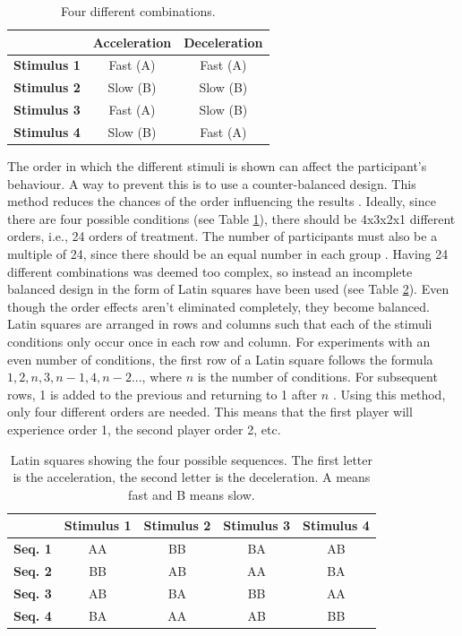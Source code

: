 \begin{table}[htbp]
\small
\centering
\begin{tabular}{|c|c|c|}
\hline  & \textbf{Acceleration}
& \textbf{Deceleration}\\\hline
\textbf{Stimulus 1} & Fast (A)
& Fast (A)
\\\hline
\textbf{Stimulus 2} & Slow (B)
& Slow (B)
\\\hline
\textbf{Stimulus 3} & Fast (A)
& Slow (B)
\\\hline
\textbf{Stimulus 4} & Slow (B)
& Fast (A)
\\\hline
\end{tabular}
\caption{Four different combinations.}
\label{tab:combinations}
\end{table}

The order in which the different stimuli is shown can affect the participant's behaviour.  A way to prevent this is to use a counter-balanced design. This method reduces the chances of the order influencing the results \cite{experimental2}. Ideally, since there are four possible conditions (see Table \ref{tab:combinations}), there should be 4x3x2x1 different orders, i.e., 24 orders of treatment. The number of participants must also be a multiple of 24, since there should be an equal number in each group \cite{experimental2}. Having 24 different combinations was deemed too complex, so instead an incomplete balanced design in the form of Latin squares have been used (see Table \ref{table:latin}). Even though the order effects aren't eliminated completely, they become balanced. Latin squares are arranged in rows and columns such that each of the stimuli conditions only occur once in each row and column. For experiments with an even number of conditions, the first row of a Latin square follows the formula $1, 2, n, 3, n-1, 4, n-2...$, where $n$ is the number of conditions. For subsequent rows, 1 is added to the previous and returning to 1 after $n$ \cite{experimental2}. Using this method, only four different orders are needed. This means that the first player will experience order 1, the second player order 2, etc.

\begin{table}[htbp]
\scriptsize
\centering
\begin{tabular}{|c|c|c|c|c|}
\hline
 & \textbf{Stimulus 1} & \textbf{Stimulus 2} & \textbf{Stimulus 3} & \textbf{Stimulus 4}\\
 \hline
\textbf{Seq. 1} & AA & BB & BA & AB\\
\hline
\textbf{Seq. 2} & BB & AB & AA & BA\\
\hline
\textbf{Seq. 3} & AB & BA & BB & AA\\
\hline
\textbf{Seq. 4} & BA & AA & AB & BB\\
\hline
\end{tabular}
\caption{Latin squares showing the four possible sequences. The first letter is the acceleration, the second letter is the deceleration. A means fast and B means slow.}
\label{table:latin}
\end{table}

